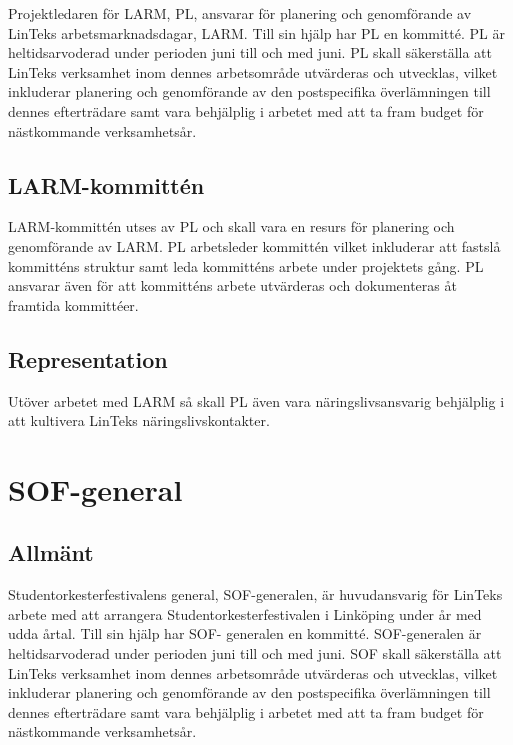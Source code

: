 Projektledaren för LARM, PL, ansvarar för planering och genomförande av
LinTeks arbetsmarknadsdagar, LARM. Till sin hjälp har PL en kommitté. PL
är heltidsarvoderad under perioden juni till och med juni. PL skall
säkerställa att LinTeks verksamhet inom dennes arbetsområde utvärderas
och utvecklas, vilket inkluderar planering och genomförande av den
postspecifika överlämningen till dennes efterträdare samt vara
behjälplig i arbetet med att ta fram budget för nästkommande
verksamhetsår.

\hypertarget{larm-kommittuxe9n}{%
\subsection{LARM-kommittén}\label{larm-kommittuxe9n}}

LARM-kommittén utses av PL och skall vara en resurs för planering och
genomförande av LARM. PL arbetsleder kommittén vilket inkluderar att
fastslå kommitténs struktur samt leda kommitténs arbete under projektets
gång. PL ansvarar även för att kommitténs arbete utvärderas och
dokumenteras åt framtida kommittéer.

\hypertarget{representation}{%
\subsection{Representation}\label{representation}}

Utöver arbetet med LARM så skall PL även vara näringslivsansvarig
behjälplig i att kultivera LinTeks näringslivskontakter.

\hypertarget{sof-general}{%
\section{SOF-general}\label{sof-general}}

\hypertarget{allmuxe4nt-7}{%
\subsection{Allmänt}\label{allmuxe4nt-7}}

Studentorkesterfestivalens general, SOF-generalen, är huvudansvarig för
LinTeks arbete med att arrangera Studentorkesterfestivalen i Linköping
under år med udda årtal. Till sin hjälp har SOF- generalen en kommitté.
SOF-generalen är heltidsarvoderad under perioden juni till och med juni.
SOF skall säkerställa att LinTeks verksamhet inom dennes arbetsområde
utvärderas och utvecklas, vilket inkluderar planering och genomförande
av den postspecifika överlämningen till dennes efterträdare samt vara
behjälplig i arbetet med att ta fram budget för nästkommande
verksamhetsår.

